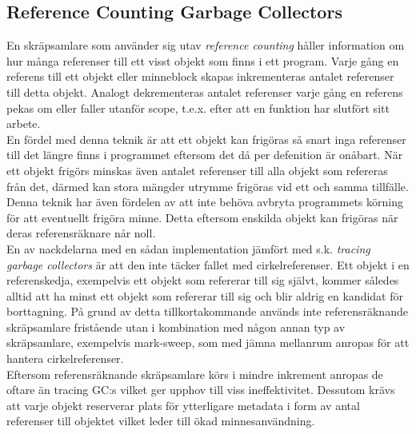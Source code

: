 \documentclass{article}
\begin{document}
\subsection{Reference Counting Garbage Collectors}
En skräpsamlare som använder sig utav \textit{reference counting} håller information om hur många referenser till ett visst objekt som finns i ett program. Varje gång en referens till ett objekt eller minneblock skapas inkrementeras antalet referenser till detta objekt. Analogt dekrementeras antalet referenser varje gång en referens pekas om eller faller utanför scope, t.e.x. efter att en funktion har slutfört sitt arbete.\newline
\\
En fördel med denna teknik är att ett objekt kan frigöras så snart inga referenser till det längre finns i programmet eftersom det då per defenition är onåbart. När ett objekt frigörs minskas även antalet referenser till alla objekt som refereras från det, därmed kan stora mängder utrymme frigöras vid ett och samma tillfälle.\newline
\\
Denna teknik har även fördelen av att inte behöva avbryta programmets körning för att eventuellt frigöra minne. Detta eftersom enskilda objekt kan frigöras när deras referensräknare når noll.\newline
\\
En av nackdelarna med en sådan implementation jämfört med s.k. \textit{tracing garbage collectors} är att den inte täcker fallet med cirkelreferenser. Ett objekt i en referenskedja, exempelvis ett objekt som refererar till sig självt, kommer således alltid att ha minst ett objekt som refererar till sig och blir aldrig en kandidat för borttagning. På grund av detta tillkortakommande används inte referensräknande skräpsamlare fristående utan i kombination med någon annan typ av skräpsamlare, exempelvis mark-sweep, som med jämna mellanrum anropas för att hantera cirkelreferenser\cite{banu}.\newline
\\
Eftersom referensräknande skräpsamlare körs i mindre inkrement anropas de oftare än tracing GC:s vilket ger upphov till viss ineffektivitet. Dessutom krävs att varje objekt reserverar plats för ytterligare metadata i form av antal referenser till objektet vilket leder till ökad minnesanvändning.
\end{document}
